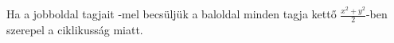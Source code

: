 Ha a jobboldal tagjait -mel becsüljük a baloldal minden tagja kettő 
$\frac{x^{2}+y^{2}}{2}$-ben szerepel a ciklikusság miatt.

